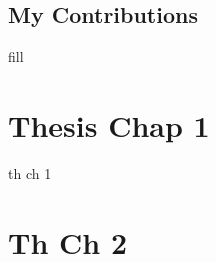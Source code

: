\documentclass[LaM,binding=0.6cm,english,noexaminfo]{sapthesis}
\begin{document}
\pagebreak

\section{My Contributions} \label{contrib}
fill


\chapter{Thesis Chap 1}
th ch 1

\chapter{Th Ch 2}


\backmatter

\printbibliography

\cleardoublepage
\end{document}
